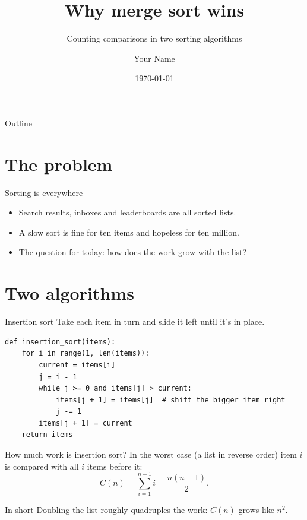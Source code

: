 \documentclass[aspectratio=169,11pt]{beamer} %
\title{Why merge sort wins}
\subtitle{Counting comparisons in two sorting algorithms}
\author{Your Name}
\institute[Your University]{School of Computing, Your University} %
\date{\today}
\begin{document}
\begin{frame}
  \titlepage
\end{frame}

\begin{frame}{Outline}
  \tableofcontents
\end{frame}

\section{The problem}

\begin{frame}{Sorting is everywhere}
  \begin{itemize}
    \item Search results, inboxes and leaderboards are all sorted lists.
    \pause
    \item A slow sort is fine for ten items and hopeless for ten million.
    \pause
    \item The question for today: \alert{how does the work grow with the list?}
  \end{itemize}
\end{frame}

\section{Two algorithms}

\begin{frame}[fragile]{Insertion sort}
  Take each item in turn and slide it left until it's in place.
\begin{lstlisting}
def insertion_sort(items):
    for i in range(1, len(items)):
        current = items[i]
        j = i - 1
        while j >= 0 and items[j] > current:
            items[j + 1] = items[j]  # shift the bigger item right
            j -= 1
        items[j + 1] = current
    return items
\end{lstlisting}
\end{frame}

\begin{frame}{How much work is insertion sort?}
  In the worst case (a list in reverse order) item $i$ is compared with all $i$ items before it:
  \begin{equation*}
    C(n) = \sum_{i=1}^{n-1} i = \frac{n(n-1)}{2}.
  \end{equation*}
  \begin{block}{In short}
    Doubling the list roughly \alert{quadruples} the work: $C(n)$ grows like $n^2$.
  \end{block}
\end{frame}
\end{document}
